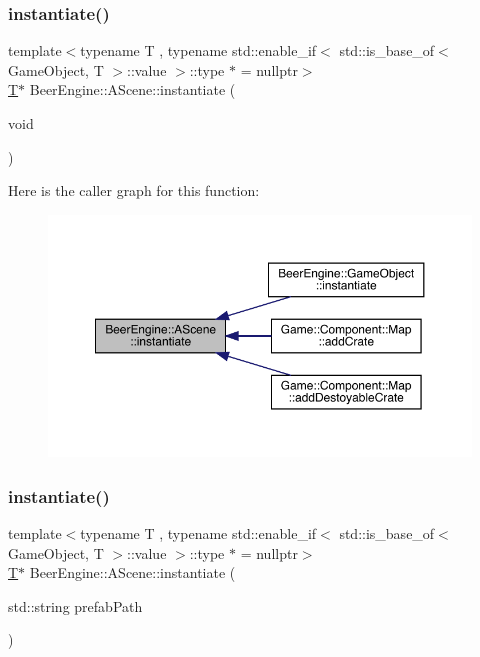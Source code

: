 \subsubsection{\texorpdfstring{instantiate()}{instantiate()}\hspace{0.1cm}{\footnotesize\ttfamily [1/2]}}
{\footnotesize\ttfamily template$<$typename T , typename std\+::enable\+\_\+if$<$ std\+::is\+\_\+base\+\_\+of$<$ Game\+Object, T $>$\+::value $>$\+::type $\ast$  = nullptr$>$ \\
\mbox{\hyperlink{namespace_beer_engine_a94f0b552f6dc910de8cdb44207981f53a8de48e594408f9fc561b2f68ce05f664}{T}}$\ast$ Beer\+Engine\+::\+A\+Scene\+::instantiate (\begin{DoxyParamCaption}\item[{void}]{ }\end{DoxyParamCaption})\hspace{0.3cm}{\ttfamily [inline]}}

Here is the caller graph for this function\+:
\nopagebreak
\begin{figure}[H]
\begin{center}
\leavevmode
\includegraphics[width=350pt]{class_beer_engine_1_1_a_scene_a2bd087ae22796d1e286c867f4f1ecc38_icgraph}
\end{center}
\end{figure}
\mbox{\label{class_beer_engine_1_1_a_scene_acf89d3198589c3e3007b0bc0579dd9ab}} 
\subsubsection{\texorpdfstring{instantiate()}{instantiate()}\hspace{0.1cm}{\footnotesize\ttfamily [2/2]}}
{\footnotesize\ttfamily template$<$typename T , typename std\+::enable\+\_\+if$<$ std\+::is\+\_\+base\+\_\+of$<$ Game\+Object, T $>$\+::value $>$\+::type $\ast$  = nullptr$>$ \\
\mbox{\hyperlink{namespace_beer_engine_a94f0b552f6dc910de8cdb44207981f53a8de48e594408f9fc561b2f68ce05f664}{T}}$\ast$ Beer\+Engine\+::\+A\+Scene\+::instantiate (\begin{DoxyParamCaption}\item[{std\+::string}]{prefab\+Path }\end{DoxyParamCaption})\hspace{0.3cm}{\ttfamily [inline]}}

